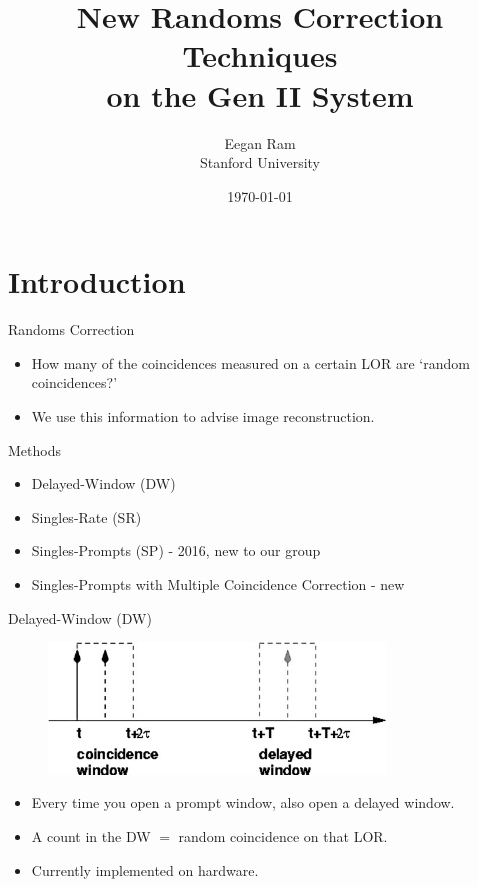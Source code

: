 \documentclass[pdf]{beamer}
\title[Randoms Correction]{New Randoms Correction Techniques \\ on the Gen II System}
\author[Eegan Ram]{Eegan Ram \texorpdfstring{\\}{}
\texorpdfstring{Stanford University}{}}
\date{\today}
\begin{document}
\begin{frame}
\thispagestyle{empty}          %
\titlepage
\end{frame}
\addtocounter{framenumber}{-1} %

\section{Introduction}

\begin{frame}{Randoms Correction}
    \begin{itemize}
        \item How many of the coincidences measured on a certain LOR are `random coincidences?'
        \item We use this information to advise image reconstruction.
    \end{itemize}
\end{frame}

\begin{frame}{Methods}
    \begin{itemize}
        \item Delayed-Window (DW)
        \item Singles-Rate (SR)
        \item Singles-Prompts (SP) - 2016, new to our group
        \item Singles-Prompts with Multiple Coincidence Correction - new
    \end{itemize}
\end{frame}

\begin{frame}{Delayed-Window (DW)}
    \begin{figure}[H]
        \centering
        \includegraphics[width=0.8\textwidth]{figures/dwdemo.png}
    \end{figure}
    \begin{itemize}
        \item Every time you open a prompt window, also open a delayed window.
        \item A count in the DW $=$ random coincidence on that LOR.
        \item Currently implemented on hardware.
    \end{itemize}
\end{frame}
\end{document}
